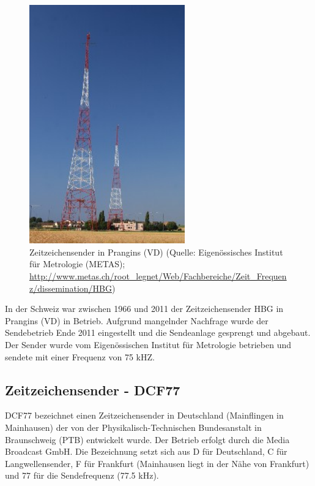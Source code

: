 \begin{figure}
  \begin{center}
    \includegraphics[width=0.6\textwidth]{./images/Analyse/Prangings_VD_CH.jpg}
  \end{center}
  \caption[Zeitzeichensender in Prangins (VD)]{Zeitzeichensender in Prangins (VD) (Quelle: Eigenössisches Institut für Metrologie (METAS); \url{http://www.metas.ch/root_legnet/Web/Fachbereiche/Zeit_Frequenz/dissemination/HBG})} 
\end{figure}

In der Schweiz war zwischen 1966 und 2011 der Zeitzeichensender HBG in Prangins (VD) in Betrieb. Aufgrund mangelnder Nachfrage wurde der Sendebetrieb Ende 2011 eingestellt und die Sendeanlage gesprengt und abgebaut. Der Sender wurde vom Eigenössischen Institut für Metrologie betrieben und sendete mit einer Frequenz von 75 kHZ.

\subsection{Zeitzeichensender - DCF77}
DCF77 bezeichnet einen Zeitzeichensender in Deutschland (Mainflingen in Mainhausen) der von der Physikalisch-Technischen Bundesanstalt in Braunschweig (PTB) entwickelt wurde. Der Betrieb erfolgt durch die Media Broadcast GmbH. Die Bezeichnung setzt sich aus D für Deutschland, C für Langwellensender, F für Frankfurt (Mainhausen liegt in der Nähe von Frankfurt) und 77 für die Sendefrequenz (77.5 kHz).

